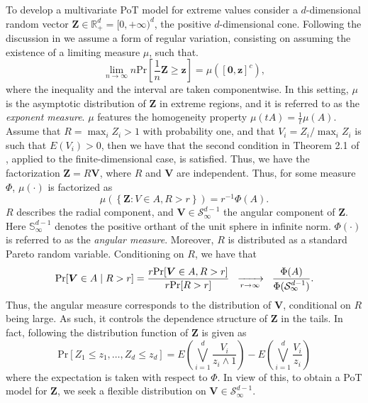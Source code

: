 To develop a multivariate PoT model for extreme values consider a $d$-dimensional random vector $\bm{Z} \in {\mathbb R}^d_+ = [0,+\infty)^d$, the positive $d$-dimensional cone. Following the discussion in \cite{goix2017} we assume a form of regular variation, consisting on assuming the existence of a limiting measure $\mu$, such that.
\[
    \lim\limits_{n\to\infty}n\text{Pr}\left[\frac{1}{n}\bm{Z}\geq \bm{z}\right] = \mu\left([\bm{0},\bm{z}]^c\right),
\]
where the inequality and the interval are taken componentwise. 
In this setting, $\mu$ is the asymptotic distribution of $\bm{Z}$ in extreme regions, and it is referred to as the
  \emph{exponent measure}.  $\mu$ features the homogeneity property $\mu(tA) = \frac{1}{t}\mu(A)$. 
Assume that $R = \max_{i} Z_i>1$ with probability one, and that $V_i = Z_i/\max_i Z_i$ is such that $E(V_i)>0$, then
we have that the second condition in Theorem 2.1 of
\cite{ferreira2014}, applied to the finite-dimensional case, is satisfied.
Thus, we have the factorization $\bm{Z} =  R\bm{V}$, where $R$ and $\bm{V}$  are independent. Thus,
for some measure $\Phi$, $\mu(\cdot)$ is factorized as
\[
    \mu\left( \left\lbrace\bm{Z} : V \in A , R > r\right\rbrace \right) = r^{-1}\Phi(A).
\]
$R$ describes the radial component, and $\bm{V} \in \mathcal{S}_{\infty}^{d-1}$ the 
angular component of $\bm{Z}$.  Here ${\mathbb S}_\infty^{d-1}$ denotes the positive
orthant of the unit sphere in infinite norm.  $\Phi(\cdot)$ is referred to as the \emph{angular measure}.   
Moreover, $R$ is distributed as a standard Pareto random variable. Conditioning on $R$, we have that
\begin{equation} \label{MGP}
    \text{Pr}\left[\bm{V} \in A \mid R > r\right]
      = \frac{r\text{Pr}\left[\bm{V} \in A, R > r\right]}{r\text{Pr}[R > r]}\hspace{0.2cm}
      \xrightarrow[r\to\infty]{~} \hspace{0.2cm} \frac{\Phi(A)}{\Phi(\mathcal{S}_{\infty}^{d-1})}.
\end{equation}
 Thus, the angular measure corresponds to the distribution of $\bm{V}$, conditional on $R$ being large.
 As such, it controls the dependence structure of $\bm{Z}$ in the tails. In fact, following \cite{ferreira2014} the distribution function of $\bm{Z}$ is given as
\begin{equation*}
	\text{Pr}[Z_1\leq z_1, \ldots ,Z_d\leq z_d] = E\left(\bigvee_{i=1}^d
\frac{V_i}{z_i\wedge 1}\right) - E\left(\bigvee_{i=1}^d
\frac{V_i}{z_i}\right) 
\end{equation*}
where the expectation is taken with respect to $\Phi$.
In view of this, to obtain a PoT model for $\bm{Z}$, we seek 
a flexible distribution on $\bm{V} \in \mathcal{S}_{\infty}^{d-1}$.

